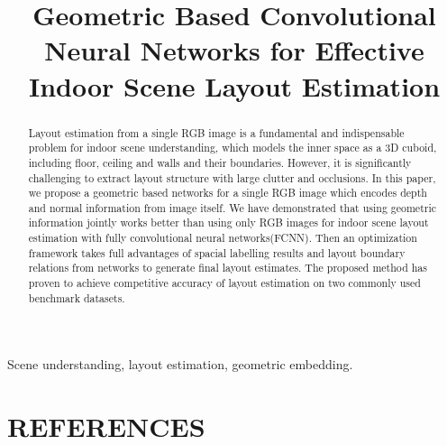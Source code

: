 \documentclass{article}
\title{Geometric Based Convolutional Neural Networks for Effective\\
 Indoor Scene Layout Estimation}
\begin{document}
%
\maketitle
%
\begin{abstract}
Layout estimation from a single RGB image is a fundamental and indispensable problem for indoor scene understanding, which models the inner space as a 3D cuboid, including floor, ceiling and walls and their boundaries. However, it is significantly challenging to extract layout structure with large clutter and occlusions.
In this paper, we propose a geometric based networks for a single RGB image which encodes depth and normal information from image itself. We have demonstrated that using geometric information jointly works better than using only RGB images for indoor scene layout estimation with fully convolutional neural networks(FCNN). Then an optimization framework takes full advantages of spacial labelling results and layout boundary relations from networks to generate final layout estimates. The proposed method has proven to achieve competitive accuracy of layout estimation on two commonly used benchmark datasets.
\end{abstract}
%
\begin{keywords}
   Scene understanding, layout estimation, geometric embedding.
\end{keywords}
%








\section{REFERENCES}
\label{sec:ref}



\end{document}
